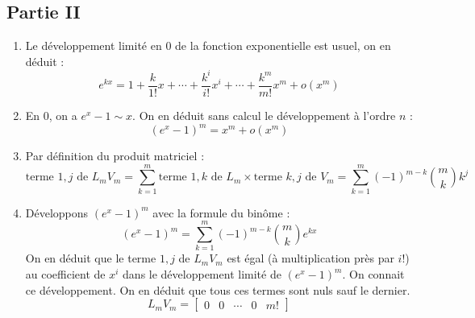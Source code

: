 \subsection*{Partie II}
\begin{enumerate}
 \item Le développement limité en $0$ de la fonction exponentielle est usuel, on en déduit :
\begin{displaymath}
 e^{kx} = 1 + \dfrac{k}{1!}x + \cdots + \dfrac{k^i}{i!}x^i+\cdots
+ \dfrac{k^m}{m!}x^m + o(x^m)
\end{displaymath}
 
\item En $0$, on  a  $e^x -1 \sim x$. On en déduit sans calcul le développement à l'ordre $n$ :
\begin{displaymath}
 (e^x -1)^m = x^m +o(x^m)
\end{displaymath}

\item Par définition du produit matriciel :
\begin{displaymath}
 \text{terme $1,j$ de } L_mV_m
= \sum_{k=1}^m \text{terme $1,k$ de }L_m \times \text{terme $k,j$ de }V_m 
= \sum_{k=1}^m(-1)^{m-k}\binom{m}{k}k^j
\end{displaymath}

\item Développons $(e^x -1)^m$ avec la formule du binôme :
\begin{displaymath}
 (e^x -1)^m = \sum _{k=1}^m (-1)^{m-k}\binom{m}{k}e^{kx}
\end{displaymath}
On en déduit que le terme $1,j$ de $L_mV_m$ est égal (à multiplication près par $i!$) au coefficient de $x^i$ dans le développement limité de $(e^x -1)^m$. On connait ce développement. On en déduit que tous ces termes sont nuls sauf le dernier.
\begin{displaymath}
 L_m V_m =
\begin{bmatrix}
 0 & 0 & \cdots & 0 & m!
\end{bmatrix}
\end{displaymath}
\end{enumerate}

